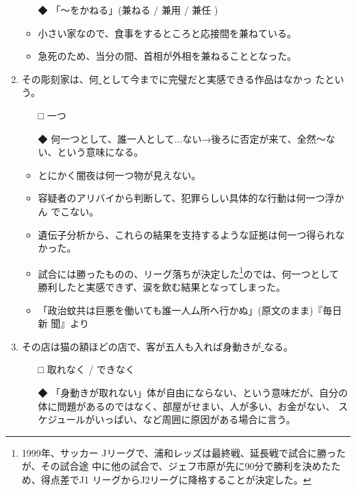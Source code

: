 \documentclass[
uplatex,
b5paper,
10pt,
dvipdfmx
]{jsbook}
\begin{document}
\begin{enumerate}
\begin{itemize}
\item[◆] 「〜をかねる」(兼ねる / 兼用 / 兼任 )
\end{itemize}
\begin{itemize}
 \item 小さい家なので、食事をするところと応接間を兼ねている。
 \item 急死のため、当分の間、首相が外相を兼ねることとなった。
\end{itemize}

\item その彫刻家は、何\underline{   }として今までに完璧だと実感できる作品はなかっ
      たという。

\begin{itemize}
\item[□] 一つ
\item[◆] 何一つとして、誰一人として...ない→後ろに否定が来て、全然〜な
	  い、という意味になる。
\end{itemize}
\begin{itemize}
\item とにかく闇夜は何一つ物が見えない。
\item 容疑者のアリバイから判断して、犯罪らしい具体的な行動は何一つ浮かん
      でこない。
\item 遺伝子分析から、これらの結果を支持するような証拠は何一つ得られなかった。
\item 試合には勝ったものの、リーグ落ちが決定した\footnote{1999年、サッカー
      Jリーグで、浦和レッズは最終戦、延長戦で試合に勝ったが、その試合途
      中に他の試合で、ジェフ市原が先に90分で勝利を決めたため、得点差でJ1
      リーグからJ2リーグに降格することが決定した。}のでは、何一つとして
      勝利したと実感できず、涙を飲む結果となってしまった。
\item 「政治蚊共は巨悪を働いても誰一人ム所へ行かぬ」(原文のまま)『毎日新
      聞』より
\end{itemize}



\item その店は猫の額ほどの店で、客が五人も入れば身動きが\underline{   }なる。 

\begin{itemize}
\item[□]  取れなく / できなく
\item[◆] 「身動きが取れない」体が自由にならない、という意味だが、自分の
	  体に問題があるのではなく、部屋がせまい、人が多い、お金がない、
	  スケジュールがいっぱい、など周囲に原因がある場合に言う。
\end{itemize}


\end{enumerate}
\end{document}
